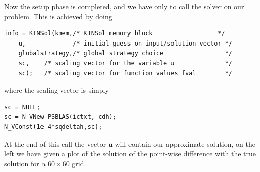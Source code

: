 \documentclass[twoside,a4paper]{refart}
\theoremstyle{definition}
\begin{document}
Now the setup phase is completed, and we have only to call the solver on our problem. This is achieved by doing
\begin{lstlisting}[style=CStyle]
info = KINSol(kmem,/* KINSol memory block                  */
	u,             /* initial guess on input/solution vector */
	globalstrategy,/* global strategy choice                 */
	sc,    /* scaling vector for the variable u              */
	sc);   /* scaling vector for function values fval        */
\end{lstlisting}
where the scaling vector is simply
\begin{lstlisting}[style=CStyle]
sc = NULL;
sc = N_VNew_PSBLAS(ictxt, cdh);
N_VConst(1e-4*sqdeltah,sc);
\end{lstlisting}
At the end of this call the vector $\mathbf{u}$ will contain our approximate solution, on the left we have given a plot of the solution of the point-wise difference with the true solution for a $60\times 60$ grid.
\end{document}
